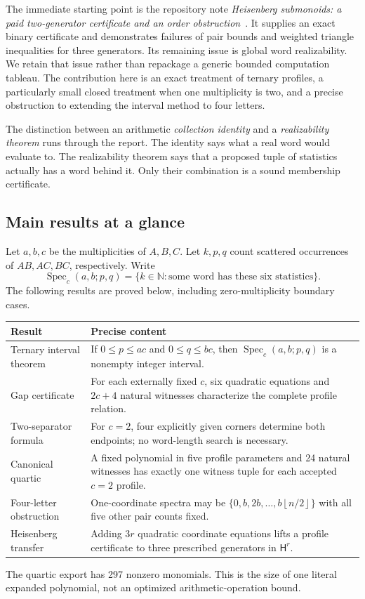 \documentclass[11pt,letterpaper]{article}
\theoremstyle{definition}
\theoremstyle{remark}
\newcommand{\N}{\mathbb N}
\newcommand{\HH}{\mathsf H}
\newcommand{\Spec}{\operatorname{Spec}}
\newcommand{\floor}[1]{\left\lfloor #1\right\rfloor}
\begin{document}
The immediate starting point is the repository note \emph{Heisenberg submonoids: a paid two-generator certificate and an order obstruction}~\cite{po-repo}. It supplies an exact binary certificate and demonstrates failures of pair bounds and weighted triangle inequalities for three generators. Its remaining issue is global word realizability. We retain that issue rather than repackage a generic bounded computation tableau. The contribution here is an exact treatment of ternary profiles, a particularly small closed treatment when one multiplicity is two, and a precise obstruction to extending the interval method to four letters.

The distinction between an arithmetic \emph{collection identity} and a \emph{realizability theorem} runs through the report. The identity says what a real word would evaluate to. The realizability theorem says that a proposed tuple of statistics actually has a word behind it. Only their combination is a sound membership certificate.

\subsection{Main results at a glance}
Let $a,b,c$ be the multiplicities of $A,B,C$. Let $k,p,q$ count scattered occurrences of $AB,AC,BC$, respectively. Write
\[
 \Spec_c(a,b;p,q)=\{k\in\N:\text{some word has these six statistics}\}.
\]
The following results are proved below, including zero-multiplicity boundary cases.
\begin{center}
\small
\begin{tabular}{p{.25\linewidth}p{.65\linewidth}}
\toprule
Result & Precise content \\
\midrule
Ternary interval theorem & If $0\le p\le ac$ and $0\le q\le bc$, then $\Spec_c(a,b;p,q)$ is a nonempty integer interval. \\
Gap certificate & For each externally fixed $c$, six quadratic equations and $2c+4$ natural witnesses characterize the complete profile relation. \\
Two-separator formula & For $c=2$, four explicitly given corners determine both endpoints; no word-length search is necessary. \\
Canonical quartic & A fixed polynomial in five profile parameters and 24 natural witnesses has exactly one witness tuple for each accepted $c=2$ profile. \\
Four-letter obstruction & One-coordinate spectra may be $\{0,b,2b,\ldots,b\floor{n/2}\}$ with all five other pair counts fixed. \\
Heisenberg transfer & Adding $3r$ quadratic coordinate equations lifts a profile certificate to three prescribed generators in $\HH^r$. \\
\bottomrule
\end{tabular}
\end{center}
The quartic export has 297 nonzero monomials. This is the size of one literal expanded polynomial, not an optimized arithmetic-operation bound.
\end{document}

